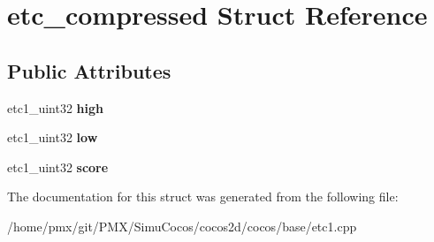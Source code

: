 \hypertarget{structetc__compressed}{}\section{etc\+\_\+compressed Struct Reference}
\label{structetc__compressed}
\subsection*{Public Attributes}
\begin{DoxyCompactItemize}
\item 
\mbox{\label{structetc__compressed_abb059bcaea20519ccf55a774318d5fff}} 
etc1\+\_\+uint32 {\bfseries high}
\item 
\mbox{\label{structetc__compressed_aa82e824e8f18ad05e5b9103a3ffeae81}} 
etc1\+\_\+uint32 {\bfseries low}
\item 
\mbox{\label{structetc__compressed_aa06693bf02e7d39f2535c10e60571027}} 
etc1\+\_\+uint32 {\bfseries score}
\end{DoxyCompactItemize}


The documentation for this struct was generated from the following file\+:\begin{DoxyCompactItemize}
\item 
/home/pmx/git/\+P\+M\+X/\+Simu\+Cocos/cocos2d/cocos/base/etc1.\+cpp\end{DoxyCompactItemize}
